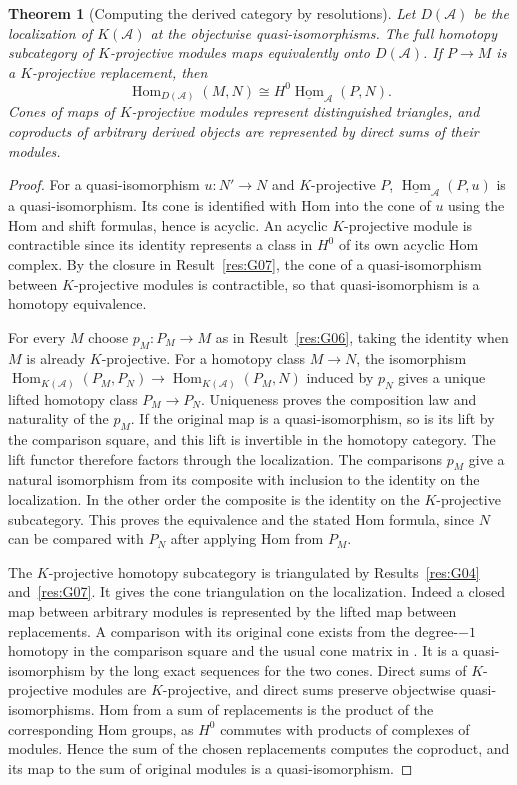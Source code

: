 \documentclass[11pt,oneside,openany]{book}
\newtheorem{theorem}{Theorem}[chapter]
\theoremstyle{definition}
\theoremstyle{remark}
\begin{document}
\begin{theorem}[Computing the derived category by resolutions]\label{res:G08}
Let \(D(\mathcal A)\) be the localization of \(K(\mathcal A)\)
at the objectwise quasi-isomorphisms. The full homotopy subcategory
of \(K\)-projective modules maps equivalently onto \(D(\mathcal A)\).
If \(P\to M\) is a \(K\)-projective replacement, then
\[
 \operatorname{Hom}_{D(\mathcal A)}(M,N)
      \cong H^0\underline{\operatorname{Hom}}_{\mathcal A}(P,N).
\]
Cones of maps of \(K\)-projective modules represent distinguished
triangles, and coproducts of arbitrary derived objects are
represented by direct sums of their modules.
\end{theorem}
\begin{proof}
For a quasi-isomorphism \(u:N'\to N\) and \(K\)-projective \(P\),
\(\underline{\operatorname{Hom}}_{\mathcal A}(P,u)\) is a
quasi-isomorphism. Its cone is identified with Hom into the cone
of \(u\) using the Hom and shift formulas, hence is acyclic.
An acyclic \(K\)-projective module is contractible since its
identity represents a class in \(H^0\) of its own acyclic Hom
complex. By the closure in Result~\ref{res:G07}, the cone of a
quasi-isomorphism between \(K\)-projective modules is contractible,
so that quasi-isomorphism is a homotopy equivalence.

For every \(M\) choose \(p_M:P_M\to M\) as in Result~\ref{res:G06},
taking the identity when \(M\) is already \(K\)-projective.
For a homotopy class \(M\to N\), the isomorphism
\(\operatorname{Hom}_{K(\mathcal A)}(P_M,P_N)\to
  \operatorname{Hom}_{K(\mathcal A)}(P_M,N)\)
induced by \(p_N\) gives a unique lifted homotopy class
\(P_M\to P_N\). Uniqueness proves the composition law and
naturality of the \(p_M\). If the original map is a quasi-isomorphism,
so is its lift by the comparison square, and this lift is
invertible in the homotopy category. The lift functor therefore
factors through the localization. The comparisons \(p_M\) give a
natural isomorphism from its composite with inclusion to the
identity on the localization. In the other order the composite
is the identity on the \(K\)-projective subcategory. This proves
the equivalence and the stated Hom formula, since \(N\) can be
compared with \(P_N\) after applying Hom from \(P_M\).

The \(K\)-projective homotopy subcategory is triangulated by
Results~\ref{res:G04} and~\ref{res:G07}. It gives the cone
triangulation on the localization. Indeed a closed map between
arbitrary modules is represented by the lifted map between
replacements. A comparison with its original cone exists from
the degree-\(-1\) homotopy in the comparison square and the
usual cone matrix in \cite[K05]{ha-core}. It is a quasi-isomorphism
by the long exact sequences for the two cones. Direct sums of
\(K\)-projective modules are \(K\)-projective, and direct sums preserve
objectwise quasi-isomorphisms. Hom from a sum of replacements is
the product of the corresponding Hom groups, as \(H^0\) commutes
with products of complexes of modules. Hence the sum of the
chosen replacements computes the coproduct, and its map to the
sum of original modules is a quasi-isomorphism.
\end{proof}
\end{document}

